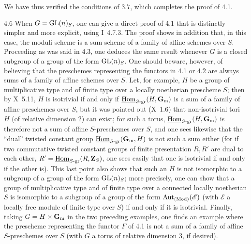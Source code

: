 We have thus verified the conditions of 3.7, which completes the proof of 4.1.

\begin{remark}{4.6}\label{XI.4.6}
When $G=\operatorname{GL}(n)_S$, one can give a direct proof of 4.1 that is distinctly simpler and more explicit, using I~4.7.3. The proof shows in addition that, in this case, the moduli scheme is a sum scheme of a family of affine schemes over $S$. Proceeding as was said in 4.3, one deduces the same result whenever $G$ is a closed subgroup of a group of the form $\operatorname{GL}(n)_S$. One should beware, however, of believing that the preschemes representing the functors in 4.1 or 4.2 are always sums of a family of affine schemes over $S$. Let, for example, $H$ be a group of multiplicative type and of finite type over a locally noetherian prescheme $S$; then by X~5.11, $H$ is isotrivial if and only if $\underline{\operatorname{Hom}}_{S\text{-gr}}(H,\mathbf{G}_{\mathrm{m}})$ is a sum of a family of affine preschemes over $S$, but it was pointed out (X~1.6) that non-isotrivial tori $H$ (of relative dimension 2) can exist; for such a torus, $\underline{\operatorname{Hom}}_{S\text{-gr}}(H,\mathbf{G}_{\mathrm{m}})$ is therefore not a sum of affine $S$-preschemes over $S$, and one sees likewise that the ``dual'' twisted constant group $\underline{\operatorname{Hom}}_{S\text{-gr}}(\mathbf{G}_{\mathrm{m}},H)$ is not such a sum either (for if two commutative twisted constant groups of finite presentation $R,R'$ are dual to each other, $R'=\underline{\operatorname{Hom}}_{S\text{-gr}}(R,\mathbf{Z}_S)$, one sees easily that one is isotrivial if and only if the other is). This last point also shows that such an $H$ is not isomorphic to a subgroup of a group of the form $\operatorname{GL}(n)_S$; more precisely, one can show that a group of multiplicative type and of finite type over a connected locally noetherian $S$ is isomorphic to a subgroup of a group of the form $\operatorname{Aut}_{\textup{(Mod)}}(\mathscr E)$ (with $\mathscr E$ a locally free module of finite type over $S$) if and only if it is isotrivial. Finally, taking $G=H\times\mathbf{G}_{\mathrm{m}}$ in the two preceding examples, one finds an example where the prescheme representing the functor $F$ of 4.1 is not a sum of a family of affine $S$-preschemes over $S$ (with $G$ a torus of relative dimension 3, if desired).
\end{remark}
